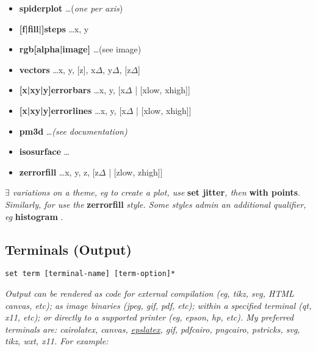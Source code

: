 {\begin{itemize}
    \item \textbf{spiderplot} \dots (\textit{one per axis}) 
    \item \textbf{{[f|fill|]}steps} \dots x, y
    \item \textbf{rgb[alpha|image]} \dots (see image)
    \item \textbf{vectors} \dots x, y, [z], x$\Delta$, y$\Delta$, [z$\Delta$] 
    \item \textbf{{[x|xy|y]}errorbars} \dots x, y, [x$\Delta$ | [xlow, xhigh]] 
    \item \textbf{{[x|xy|y]}errorlines} \dots x, y, [x$\Delta$ | [xlow, xhigh]] 
    \item \textbf{pm3d} \dots \textit{(see documentation)}
    \item \textbf{isosurface} \dots <voxel-grid-file>
    \item \textbf{zerrorfill} \dots x, y, z, [z$\Delta$ | [zlow, zhigh]] 
\end{itemize}}

\textit{$\exists$ variations on a theme, eg to create a  plot, use }\textbf{set jitter}\textit{, then }\textbf{with points}.\textit{ Similarly, for  use the }\textbf{zerrorfill}\textit{ style. Some styles admin an additional qualifier, eg }\textbf{histogram }.\\


\subsection*{Terminals (Output)}
\begin{lstlisting}
set term [terminal-name] [term-option]*
\end{lstlisting}

\textit{Output can be rendered as code for external compilation (eg, tikz, svg, HTML canvas, etc); as image binaries (jpeg, gif, pdf, etc); within a specified terminal (qt, x11, etc); or directly to a supported printer (eg, epson, hp, etc). My preferred terminals are: cairolatex, canvas, \href{http://gnuplot.sourceforge.net/docs/tutorial.pdf}{epslatex}, gif, pdfcairo, pngcairo, pstricks, svg, tikz, wxt, x11. For example:}

\\
\\


